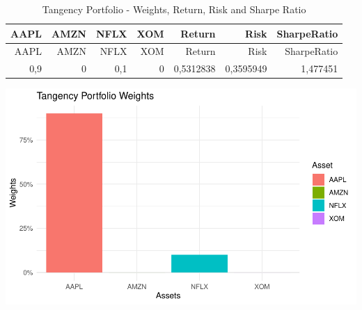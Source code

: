 \documentclass[
]{article}
\begin{document}
\begin{longtable}[]{@{}rrrrrrr@{}}
\caption{Tangency Portfolio - Weights, Return, Risk and Sharpe
Ratio}\tabularnewline
\toprule()
AAPL & AMZN & NFLX & XOM & Return & Risk & SharpeRatio \\
\midrule()
\endfirsthead
\toprule()
AAPL & AMZN & NFLX & XOM & Return & Risk & SharpeRatio \\
\midrule()
\endhead
0,9 & 0 & 0,1 & 0 & 0,5312838 & 0,3595949 & 1,477451 \\
\bottomrule()
\end{longtable}

\begin{center}\includegraphics{EfficientFrontier_files/figure-latex/plot Tangency Portfolio-1} \end{center}
\end{document}
